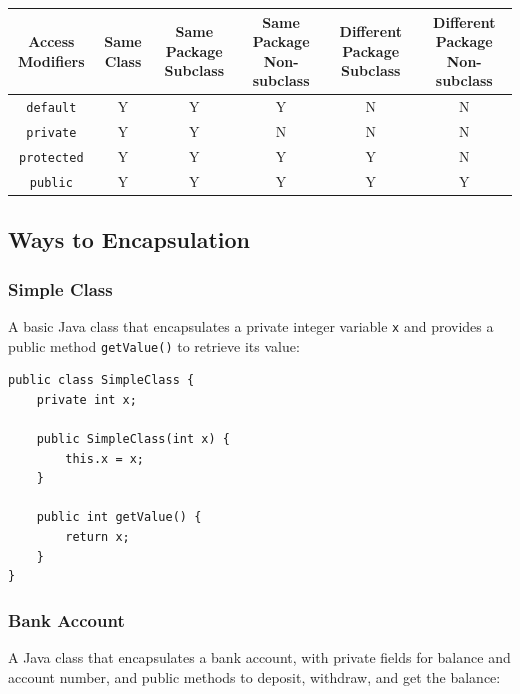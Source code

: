 \documentclass{book}
\begin{document}
\begin{center}
	\begin{tabular}{|c|c|c|c|c|c|}
		\hline
		\textbf{Access Modifiers} & \textbf{Same Class} & \textbf{Same Package Subclass} & \textbf{Same Package Non-subclass} & \textbf{Different Package Subclass} & \textbf{Different Package Non-subclass} \\
		\hline
		\texttt{default}          & Y                   & Y                              & Y                                  & N                                   & N                                       \\
		\hline
		\texttt{private}          & Y                   & Y                              & N                                  & N                                   & N                                       \\
		\hline
		\texttt{protected}        & Y                   & Y                              & Y                                  & Y                                   & N                                       \\
		\hline
		\texttt{public}           & Y                   & Y                              & Y                                  & Y                                   & Y                                       \\
		\hline
	\end{tabular}
\end{center}

\subsection{Ways to Encapsulation}
\subsubsection{Simple Class}
A basic Java class that encapsulates a private integer variable \texttt{x} and provides a public method \texttt{getValue()} to retrieve its value:

\begin{verbatim}
public class SimpleClass {
    private int x;

    public SimpleClass(int x) {
        this.x = x;
    }

    public int getValue() {
        return x;
    }
}
\end{verbatim}

\subsubsection{Bank Account}
A Java class that encapsulates a bank account, with private fields for balance and account number, and public methods to deposit, withdraw, and get the balance:
\end{document}
